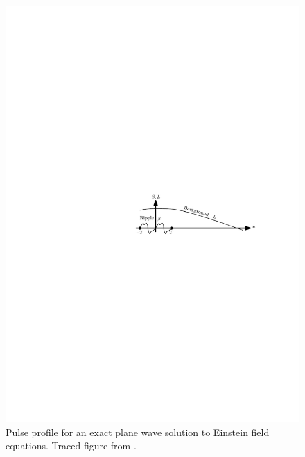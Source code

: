 \begin{figure}[h]
\begin{centering}
\includegraphics{Kap3/background.pdf}\caption{Pulse profile for an exact plane wave solution to Einstein field equations. Traced figure from \cite{GRAVITATION}.
\label{fig:pulse}}
\par\end{centering}
\end{figure}


